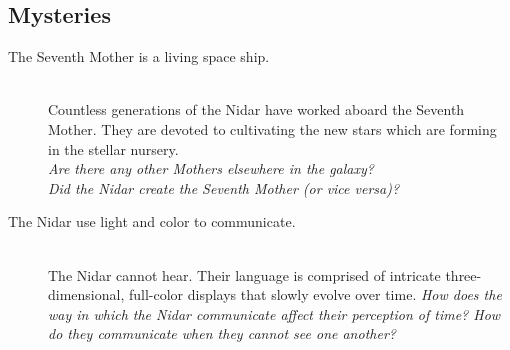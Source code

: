 \documentclass[11pt, a5paper, parskip=half-, DIV=12]{scrartcl}
\begin{document}
\subsection*{Mysteries}
\begin{description}
	\item[The Seventh Mother is a living space ship.] \phantom{} \\ Countless generations of the Nidar have worked aboard the Seventh Mother. They are devoted to cultivating the new stars which are forming in the stellar nursery. \\ \textit{Are there any other Mothers elsewhere in the galaxy? \\ Did the Nidar create the Seventh Mother (or vice versa)?}
	\item[The Nidar use light and color to communicate.] \phantom{a} \\ The Nidar cannot hear. Their language is comprised of intricate three-dimensional, full-color displays that slowly evolve over time. \textit{How does the way in which the Nidar communicate affect their perception of time? How do they communicate when they cannot see one another?}
\end{description}

\newpage



\newpage

\thispagestyle{empty}
\end{document}
